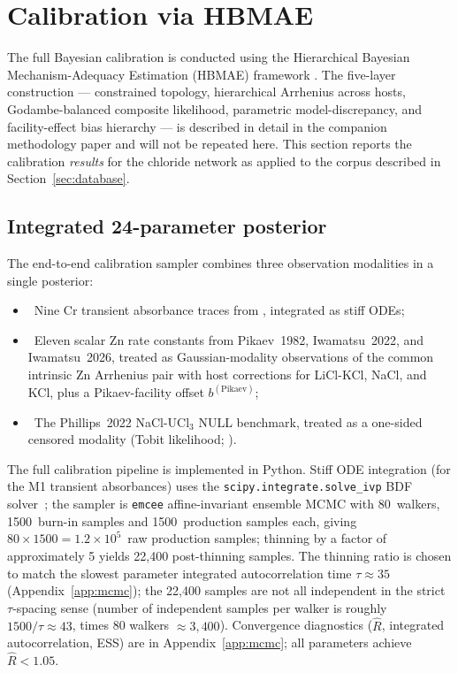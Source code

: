 \documentclass[11pt]{article}
\theoremstyle{plain}
\theoremstyle{definition}
\theoremstyle{remark}
\newcommand{\HBMAE}{HBMAE\xspace}
\begin{document}
\section{Calibration via HBMAE}\label{sec:calibration}

The full Bayesian calibration is conducted using the Hierarchical Bayesian
Mechanism-Adequacy Estimation (\HBMAE) framework
\citep{Tanore2026PaperI}.  The five-layer construction --- constrained
topology, hierarchical Arrhenius across hosts, Godambe-balanced composite
likelihood, parametric model-discrepancy, and facility-effect bias
hierarchy --- is described in detail in the companion methodology paper and
will not be repeated here.  This section reports the calibration
\emph{results} for the chloride network as applied to the corpus described
in Section~\ref{sec:database}.

\subsection{Integrated 24-parameter posterior}\label{sec:cal:integrated}

The end-to-end calibration sampler combines three observation modalities in
a single posterior:
\begin{itemize}
\item[\textbf{(M1)}]~Nine Cr transient absorbance traces from
      \citet{Iwamatsu2026}, integrated as stiff ODEs;
\item[\textbf{(M2)}]~Eleven scalar Zn rate constants from Pikaev~1982,
      Iwamatsu~2022, and Iwamatsu~2026, treated as Gaussian-modality
      observations of the common intrinsic Zn Arrhenius pair with host
      corrections for LiCl-KCl, NaCl, and KCl, plus a Pikaev-facility offset
      $b^{(\mathrm{Pikaev})}$;
\item[\textbf{(M3)}]~The Phillips~2022 NaCl-UCl$_3$ NULL benchmark, treated
      as a one-sided censored modality (Tobit likelihood; \citealp{Tobin1958}).
\end{itemize}

The full calibration pipeline is implemented in Python.  Stiff ODE
integration (for the M1 transient absorbances) uses the
\texttt{scipy.integrate.solve\_ivp} BDF solver~\citep{Hindmarsh2005};
the sampler is \texttt{emcee} \citep{ForemanMackey2013} affine-invariant
ensemble MCMC with 80~walkers, 1500~burn-in samples and 1500~production
samples each, giving $80\!\times\!1500 = 1.2\!\times\!10^5$~raw production
samples; thinning by a factor of approximately 5 yields 22{,}400
post-thinning samples.  The thinning ratio is chosen to match the slowest
parameter integrated autocorrelation time $\tau\!\approx\!35$
(Appendix~\ref{app:mcmc}); the 22{,}400 samples are not all independent
in the strict $\tau$-spacing sense (number of independent samples per
walker is roughly $1500/\tau\!\approx\!43$, times 80 walkers
$\approx\!3{,}400$).  Convergence diagnostics ($\hat{R}$, integrated
autocorrelation, ESS) are in Appendix~\ref{app:mcmc}; all parameters
achieve $\hat{R} < 1.05$.
\end{document}

